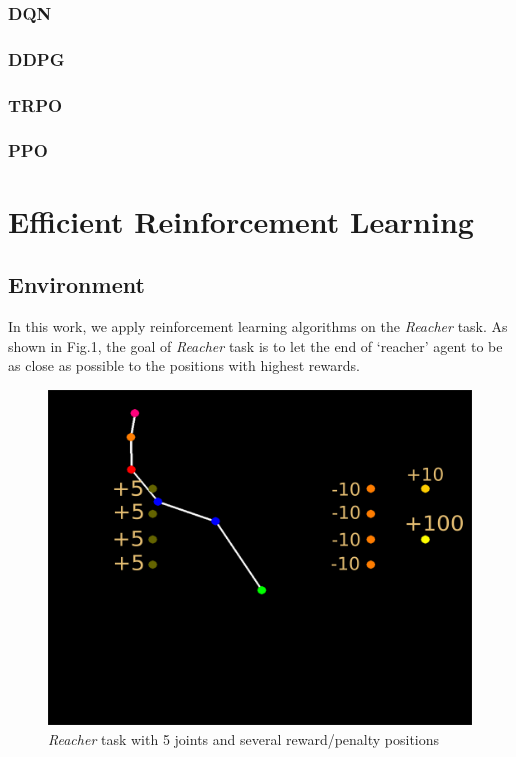 \documentclass{article}
\begin{document}
\subsubsection{DQN}
\subsubsection{DDPG}
\subsubsection{TRPO}
\subsubsection{PPO}






\section{Efficient Reinforcement Learning}
\subsection{Environment}
In this work, we apply reinforcement learning algorithms on the \textit{Reacher} task. As shown in Fig.1, the goal of \textit{Reacher} task is to let the end of `reacher'  agent to be as close as possible to the positions with highest rewards.
\begin{figure}[htbp]
	\centering
	\includegraphics[scale=0.2]{img/reacher.png}
	\caption{\textit{Reacher} task with 5 joints and several reward/penalty positions}
	\label{fig:universe}
\end{figure}
\end{document}
